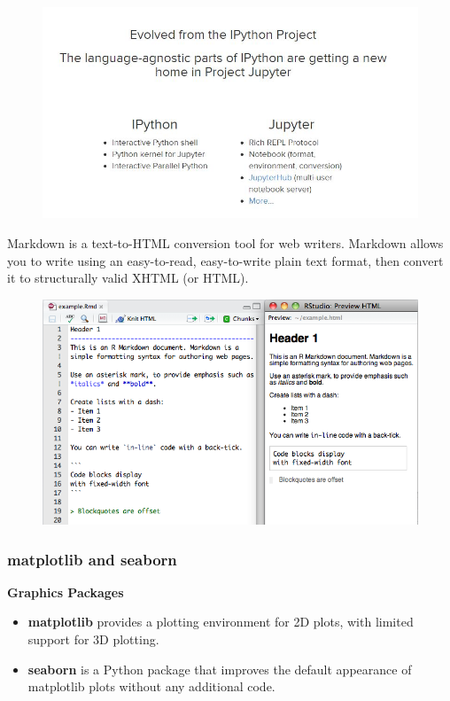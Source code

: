 \documentclass[MASTER.tex]{subfiles}
\begin{document}
\begin{frame}
	\begin{figure}
\centering
\includegraphics[width=1.0\linewidth]{jupytersiteinfo}

\end{figure}

\end{frame}
\begin{frame}
	Markdown is a text-to-HTML conversion tool for web writers. Markdown allows you to write using an easy-to-read, easy-to-write plain text format, then convert it to structurally valid XHTML (or HTML).
	\begin{figure}
\centering
\includegraphics[width=0.85\linewidth]{markdownOverview}

\end{figure}

\end{frame}
\begin{frame}
\frametitle{matplotlib and seaborn}
\large
	\vspace{-0.4cm}
\textbf{Graphics Packages}
\begin{itemize}
\item \textbf{matplotlib} provides a plotting environment for 2D plots, with limited support for 3D plotting. 
\item \textbf{seaborn} is
a Python package that improves the default appearance of matplotlib plots without any additional code.
\end{itemize}

\end{frame}
\end{document}

